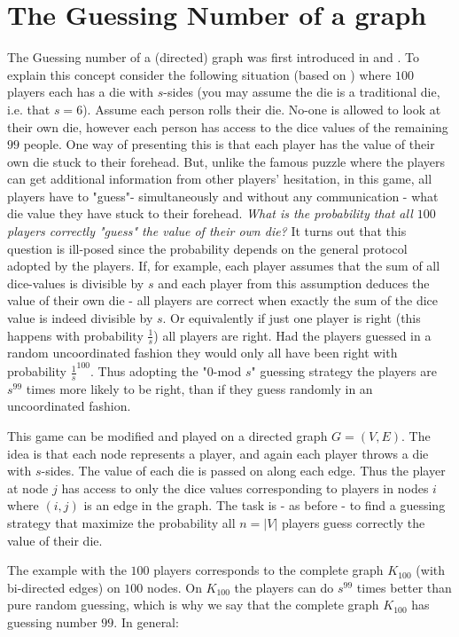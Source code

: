 \documentclass[12pt]{article}
\begin{document}
\section{The Guessing Number of a graph}

The Guessing number of a (directed) graph was first introduced in \cite{Riis05} and \cite{Riis07}. To explain this concept consider the following situation (based on \cite{Riis04}) where $100$ players each has a die with $s$-sides (you may assume the die is a traditional die, i.e. that $s=6$). Assume each person rolls their die. No-one is allowed to look at their own die, however each person has access to the dice values of the remaining $99$ people. One way of presenting this is that each player has the value of their own die
stuck to their forehead. But, unlike the famous puzzle where the players can get additional information from other players' hesitation, in this game, all players have to "guess"- simultaneously and without any communication - what die value they have stuck to their forehead. 
{\it What is the probability that all  $100$ players correctly "guess" the value of their own die?} 
It turns out that this question is ill-posed since the probability depends on the general protocol adopted by the players. If, for example, each player assumes that the sum of all dice-values is divisible by $s$ and each player from this assumption deduces the value of their own die - all players are correct
when exactly the sum of the dice value is indeed divisible by $s$. Or equivalently if just one player is right (this happens with probability $\frac{1}{s}$) all players are right. 
Had the players guessed in a random uncoordinated fashion they would only all have been right
with probability $\frac{1}{s}^{100}$. Thus adopting the "$0$-mod $s$" guessing strategy 
the players are $s^{99}$ times more likely to be right, than if they guess randomly in an uncoordinated fashion.

This game can be modified and played on a directed graph $G=(V,E)$. The idea is that each node represents a player, and again each player throws a die with $s$-sides.  The value of each die is passed on along each edge. Thus the player at node $j$ has access to only the dice values corresponding to players in nodes $i$ where $(i,j)$ is an edge in the graph. The task is - as before - to find a guessing strategy that maximize the probability all $n=|V|$ players guess correctly the value of their die.

The example with the $100$ players corresponds to the complete graph $K_{100}$ (with bi-directed edges) on $100$ nodes. On $K_{100}$ the players can do $s^{99}$ times better than pure random guessing, which is why we say that the complete graph $K_{100}$ has guessing number $99$. In general:
\end{document}
